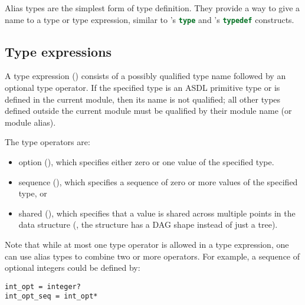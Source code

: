Alias types are the simplest form of type definition.
They provide a way to give a name to a type or type expression, similar
to \sml{}'s \lstinline[language=SML]@type@ and \Cplusplus{}'s
\lstinline[language=C++]@typedef@ constructs.

\subsection{Type expressions}

A type expression () consists of a possibly qualified type name followed
by an optional type operator.
If the specified type is an ASDL primitive type or is defined in the current module,
then its name is not qualified; all other types defined outside the current module must
be qualified by their module name (or module alias).

The type operators are:
\begin{itemize}
  \item
    option (), which specifies either zero or one value of the specified type.
  \item
    sequence (\lit{*}), which specifies a sequence of zero or more values of the
    specified type, or
  \item
    shared (\lit{!}), which specifies that a value is shared across multiple points
    in the data structure (\ie{}, the structure has a DAG shape instead of just a tree).
\end{itemize}%

Note that while at most one type operator is allowed in a type expression, one can use alias
types to combine two or more operators.
For example, a sequence of optional integers could be defined by:
\begin{code}\begin{lstlisting}[language=ASDL]
int_opt = integer?
int_opt_seq = int_opt*
\end{lstlisting}\end{code}%

